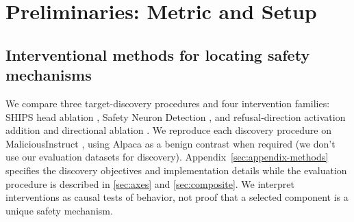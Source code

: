 \section{Preliminaries: Metric and Setup}
\label{sec:prelim}

\subsection{Interventional methods for locating safety mechanisms}

We compare three target-discovery procedures and four intervention families: SHIPS head ablation \citep{zhou2024ships}, Safety Neuron Detection
\citep{zhao2025neuron}, and refusal-direction activation addition and directional ablation \citep{arditi2024refusal}. We reproduce each discovery procedure on MaliciousInstruct \citep{bianchi2024safetytuned}, using Alpaca \citep{taori2023alpaca} as a benign contrast when required (we don't use our evaluation datasets for discovery). Appendix~\ref{sec:appendix-methods} specifies the discovery objectives and implementation details while the evaluation procedure is described in \ref{sec:axes} and \ref{sec:composite}. We interpret interventions as causal tests of behavior, not proof that a selected component is a unique safety mechanism. 


